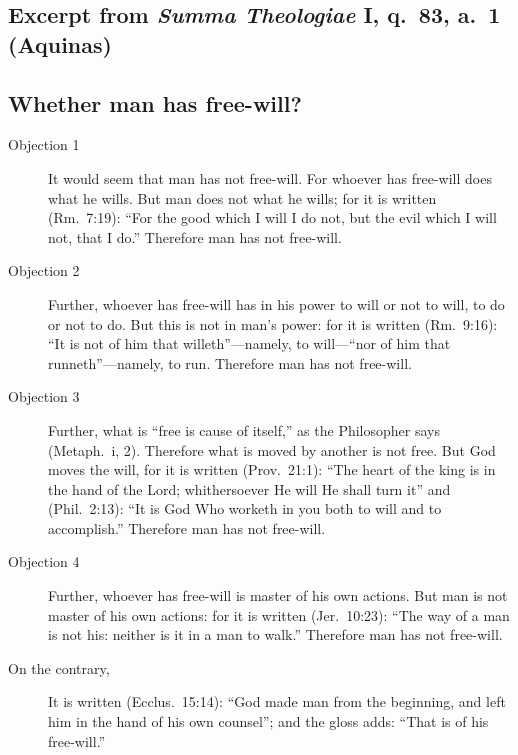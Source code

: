 \documentclass{bookclub}
\begin{document}
\begin{multicols}{2}
	\section{Excerpt from \emph{Summa Theologiae} I, q.~83, a.~1 (Aquinas)}
	\subsection{Whether man has free-will?}
	
	\begin{description}
		\item[Objection 1]  It would seem that man has not free-will. For whoever has free-will does what he wills. But man does not what he wills; for it is written (Rm.~7:19): ``For the good which I will I do not, but the evil which I will not, that I do.'' Therefore man has not free-will.
		\item[Objection 2] Further, whoever has free-will has in his power to will or not to will, to do or not to do. But this is not in man's power: for it is written (Rm.~9:16): ``It is not of him that willeth''---namely, to will---``nor of him that runneth''---namely, to run. Therefore man has not free-will.
		\item[Objection 3]  Further, what is ``free is cause of itself,'' as the Philosopher says (Metaph.~i, 2). Therefore what is moved by another is not free. But God moves the will, for it is written (Prov.~21:1): ``The heart of the king is in the hand of the Lord; whithersoever He will He shall turn it'' and (Phil.~2:13): ``It is God Who worketh in you both to will and to accomplish.'' Therefore man has not free-will.
		\item[Objection 4]  Further, whoever has free-will is master of his own actions. But man is not master of his own actions: for it is written (Jer.~10:23): ``The way of a man is not his: neither is it in a man to walk.'' Therefore man has not free-will.

		\item[On the contrary,] It is written (Ecclus.~15:14): ``God made man from the beginning, and left him in the hand of his own counsel''; and the gloss adds: ``That is of his free-will.''
		

\end{description}
\end{multicols}
\end{document}
